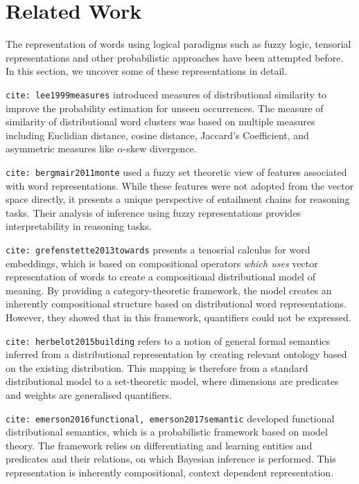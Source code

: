 \documentclass{book}
\newcommand{\citet}[1]{\texttt{cite: #1}}
\begin{document}
\section{Related Work} \label{sec: related}

The representation of words using logical paradigms such as fuzzy logic,
tensorial representations and other probabilistic approaches have been
attempted before. In this section, we uncover some of these representations in
detail. 

\citet{lee1999measures} introduced measures of distributional similarity to
improve the probability estimation for unseen occurrences. The measure of
similarity of distributional word clusters was based on multiple measures
including Euclidian distance, cosine distance, Jaccard's Coefficient, and
asymmetric measures like $\alpha$-skew divergence.

\citet{bergmair2011monte} used a fuzzy set theoretic view of features
associated with word representations. While these features were not adopted
from the vector space directly, it presents a unique perspective of entailment
chains for reasoning tasks. Their analysis of inference using fuzzy
representations provides interpretability in reasoning tasks.

\citet{grefenstette2013towards} presents a tenosrial calculus for word
embeddings, which is based on compositional operators \emph{which uses} vector
representation of words to create a compositional distributional model of
meaning. By providing a category-theoretic framework, the model creates an
inherently compositional structure based on distributional word
representations. However, they showed that in this framework, quantifiers could
not be expressed.

\citet{herbelot2015building} refers to a notion of general formal semantics
inferred from a distributional representation by creating relevant ontology
based on the existing distribution. This mapping is therefore from a standard
distributional model to a set-theoretic model, where dimensions are predicates
and weights are generalised quantifiers. 

\citet{emerson2016functional, emerson2017semantic} developed functional
distributional semantics, which is a probabilistic framework based on model
theory. The framework relies on differentiating and learning entities and
predicates and their relations, on which Bayesian inference is performed. This
representation is inherently compositional, context dependent representation. 
\end{document}
